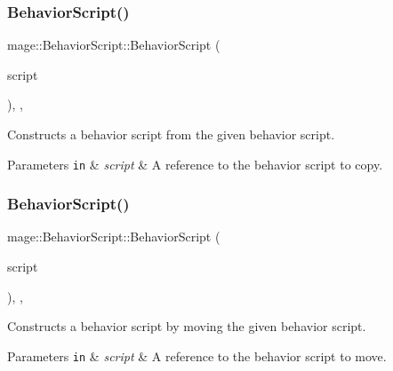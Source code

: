 \subsubsection{\texorpdfstring{Behavior\+Script()}{BehaviorScript()}\hspace{0.1cm}{\footnotesize\ttfamily [2/3]}}
{\footnotesize\ttfamily mage\+::\+Behavior\+Script\+::\+Behavior\+Script (\begin{DoxyParamCaption}\item[{const \hyperlink{classmage_1_1_behavior_script}{Behavior\+Script} \&}]{script }\end{DoxyParamCaption})\hspace{0.3cm}{\ttfamily [protected]}, {\ttfamily [default]}, {\ttfamily [noexcept]}}

Constructs a behavior script from the given behavior script.


\begin{DoxyParams}[1]{Parameters}
\mbox{\tt in}  & {\em script} & A reference to the behavior script to copy. \\
\hline
\end{DoxyParams}
\hypertarget{classmage_1_1_behavior_script_abae69e797a05fa2cd1c3b7704f1c6767}{}\label{classmage_1_1_behavior_script_abae69e797a05fa2cd1c3b7704f1c6767} 
\subsubsection{\texorpdfstring{Behavior\+Script()}{BehaviorScript()}\hspace{0.1cm}{\footnotesize\ttfamily [3/3]}}
{\footnotesize\ttfamily mage\+::\+Behavior\+Script\+::\+Behavior\+Script (\begin{DoxyParamCaption}\item[{\hyperlink{classmage_1_1_behavior_script}{Behavior\+Script} \&\&}]{script }\end{DoxyParamCaption})\hspace{0.3cm}{\ttfamily [protected]}, {\ttfamily [default]}, {\ttfamily [noexcept]}}

Constructs a behavior script by moving the given behavior script.


\begin{DoxyParams}[1]{Parameters}
\mbox{\tt in}  & {\em script} & A reference to the behavior script to move. \\
\hline
\end{DoxyParams}


